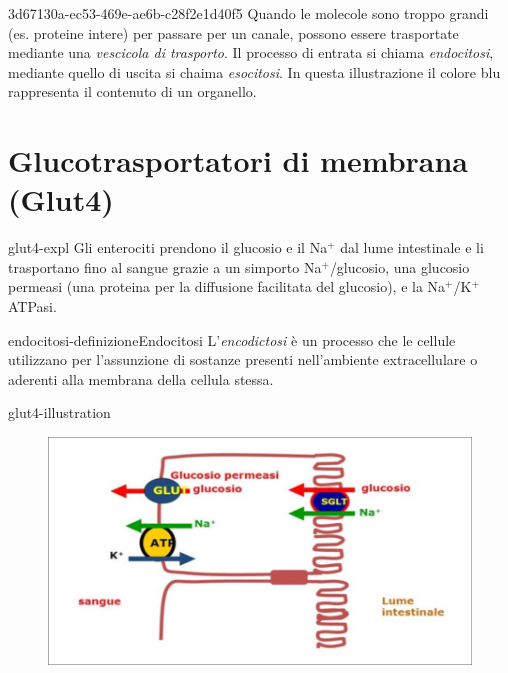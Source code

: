 \documentclass[preview]{standalone}
\begin{document}
\begin{snippet}{3d67130a-ec53-469e-ae6b-c28f2e1d40f5}
    Quando le molecole sono troppo grandi (es. proteine intere) per passare per un canale, possono essere trasportate 
mediante una \textit{vescicola di trasporto}. Il processo di entrata si chiama \textit{endocitosi},
mediante quello di uscita si chaima \textit{esocitosi}. 
In questa illustrazione il colore blu rappresenta il contenuto di un organello.
\end{snippet}


\section{Glucotrasportatori di membrana (Glut4)}

\begin{snippet}{glut4-expl}
    Gli enterociti prendono il glucosio e il Na\({}^+\) dal lume intestinale
e li trasportano fino al sangue grazie a un simporto Na\({}^+\)/glucosio, una glucosio permeasi
(una proteina per la diffusione facilitata del glucosio), e la Na\({}^+\)/K\({}^+\)ATPasi. 
\end{snippet}

\begin{snippetdefinition}{endocitosi-definizione}{Endocitosi}
    L'\textit{encodictosi} è un processo che le cellule utilizzano per l'assunzione di sostanze presenti nell'ambiente extracellulare o aderenti alla membrana della cellula stessa.
\end{snippetdefinition}

\begin{snippet}{glut4-illustration}
    \begin{center}
    \begin{figure}[h]
        \centering
        \includegraphics[width=\textwidth]{./resources/glut4.png}
    \end{figure}
    \end{center}
\end{snippet}
\end{document}
